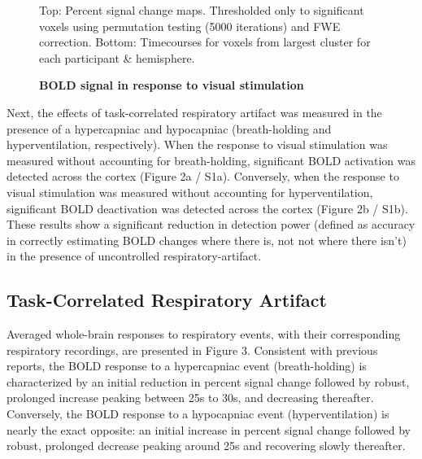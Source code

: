 \documentclass[9pt]{NEU502b-fmri}
\begin{document}
\begin{figure}
\centerline{%
%
}
\caption{\textbf{BOLD signal in response to visual stimulation}}
\par Top: Percent signal change maps. Thresholded only to significant voxels using permutation testing (5000 iterations) and FWE correction. Bottom: Timecourses for voxels from largest cluster for each participant \& hemisphere.
\end{figure}

Next, the effects of task-correlated respiratory artifact was measured in the presence of a hypercapniac and hypocapniac (breath-holding and hyperventilation, respectively). When the response to visual stimulation was measured without accounting for breath-holding, significant BOLD activation was detected across the cortex (Figure 2a / S1a). Conversely, when the response to visual stimulation was measured without accounting for hyperventilation, significant BOLD deactivation was detected across the cortex (Figure 2b / S1b). These results show a significant reduction in detection power (defined as accuracy in correctly estimating BOLD changes where there is, not not where there isn’t) in the presence of uncontrolled respiratory-artifact. 

\subsection{Task-Correlated Respiratory Artifact}
Averaged whole-brain responses to respiratory events, with their corresponding respiratory recordings, are presented in Figure 3. Consistent with previous reports, the BOLD response to a hypercapniac event (breath-holding) is characterized by an initial reduction in percent signal change followed by robust, prolonged increase peaking between 25s to 30s, and decreasing thereafter. Conversely,  the BOLD response to a hypocapniac event (hyperventilation) is nearly the exact opposite: an initial increase in percent signal change followed by robust, prolonged decrease peaking around 25s and recovering slowly thereafter. 
\end{document}
